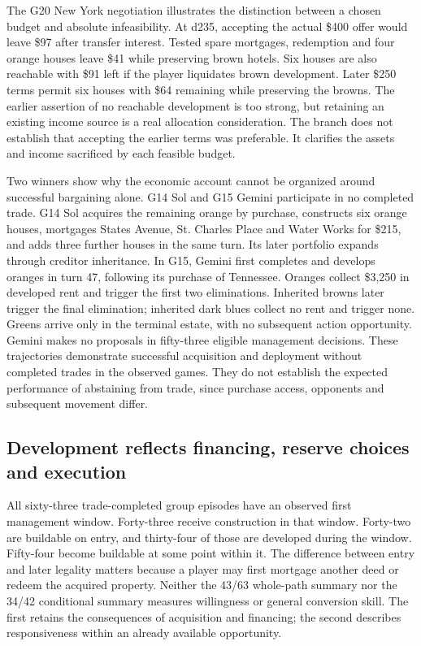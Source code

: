 The G20 New York negotiation illustrates the distinction between a chosen budget and absolute infeasibility. At d235, accepting the actual \$400 offer would leave \$97 after transfer interest. Tested spare mortgages, redemption and four orange houses leave \$41 while preserving brown hotels. Six houses are also reachable with \$91 left if the player liquidates brown development. Later \$250 terms permit six houses with \$64 remaining while preserving the browns. The earlier assertion of no reachable development is too strong, but retaining an existing income source is a real allocation consideration. The branch does not establish that accepting the earlier terms was preferable. It clarifies the assets and income sacrificed by each feasible budget.

Two winners show why the economic account cannot be organized around successful bargaining alone. G14 Sol and G15 Gemini participate in no completed trade. G14 Sol acquires the remaining orange by purchase, constructs six orange houses, mortgages States Avenue, St. Charles Place and Water Works for \$215, and adds three further houses in the same turn. Its later portfolio expands through creditor inheritance. In G15, Gemini first completes and develops oranges in turn 47, following its purchase of Tennessee. Oranges collect \$3,250 in developed rent and trigger the first two eliminations. Inherited browns later trigger the final elimination; inherited dark blues collect no rent and trigger none. Greens arrive only in the terminal estate, with no subsequent action opportunity. Gemini makes no proposals in fifty-three eligible management decisions. These trajectories demonstrate successful acquisition and deployment without completed trades in the observed games. They do not establish the expected performance of abstaining from trade, since purchase access, opponents and subsequent movement differ.

\subsection{Development reflects financing, reserve choices and execution}

All sixty-three trade-completed group episodes have an observed first management window. Forty-three receive construction in that window. Forty-two are buildable on entry, and thirty-four of those are developed during the window. Fifty-four become buildable at some point within it. The difference between entry and later legality matters because a player may first mortgage another deed or redeem the acquired property. Neither the 43/63 whole-path summary nor the 34/42 conditional summary measures willingness or general conversion skill. The first retains the consequences of acquisition and financing; the second describes responsiveness within an already available opportunity.

